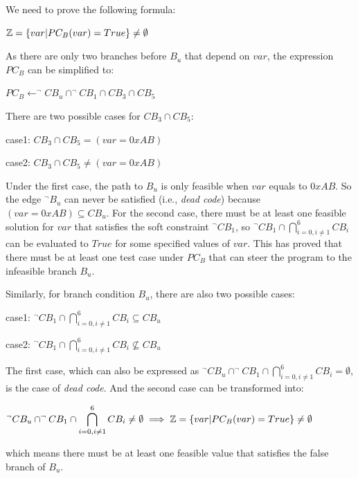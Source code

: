 We need to prove the following formula:

\begin{center}
$\mathbb{Z}=\{var\arrowvert PC_B(var) = True\} \neq \emptyset$
\end{center}

As there are only two branches before $B_u$ that depend on $var$, 
the expression $PC_B$ can be simplified to:
\begin{center}
$PC_B\leftarrow^\neg CB_u \cap ^\neg CB_1 \cap CB_3 \cap CB_5$
\end{center}

There are two possible cases for $CB_3 \cap CB_5$:
\begin{center}
case1: $CB_3 \cap CB_5 = (var = 0xAB)$

case2: $CB_3 \cap CB_5 \neq (var = 0xAB)$
\end{center}

Under the first case, the path to $B_u$ is only feasible when 
$var$ equals to $0xAB$. So the edge $^\neg B_u$ can never be 
satisfied (i.e., \emph{dead code}) because $(var = 0xAB) \subseteq CB_u$. 
For the second case, there must be at least one feasible solution 
for $var$ that satisfies the soft constraint $^\neg CB_1$, so 
$^\neg CB_1 \cap \bigcap_{i=0,i \neq 1}^{6} CB_i$ can be evaluated 
to $True$ for some specified values of $var$. This has proved that 
there must be at least one test case under $PC_B$ that can steer 
the program to the infeasible branch $B_u$.

Similarly, for branch condition $B_u$, there are also two possible cases:
\begin{center}
case1: $\displaystyle ^\neg CB_1 \cap \bigcap\limits_{i=0,i\neq 1}^6 CB_i \subseteq CB_u$

case2: $\displaystyle ^\neg CB_1 \cap \bigcap\limits_{i=0,i\neq 1}^6 CB_i \nsubseteq CB_u$
\end{center}

The first case, which can also be expressed as 
$^\neg CB_u \cap ^\neg CB_1 \cap \bigcap_{i=0,i\neq 1}^6 CB_i = \emptyset$, 
is the case of \emph{dead code}. And the second case can be transformed into:
\begin{center}
$\displaystyle ^\neg CB_u \cap ^\neg CB_1 \cap \bigcap\limits_{i=0,i\neq 1}^6 CB_i \neq \emptyset \implies \mathbb{Z} = \{var\arrowvert PC_B(var) = True\} \neq \emptyset$
\end{center}

\noindent which means there must be at least one feasible value 
that satisfies the false branch of $B_u$.

